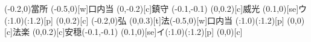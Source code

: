 \documentclass[m_shidai]{subfiles}
\begin{document}
\newline
\karifu(-0.2,0){當所}
{\chikara{\lw}\tsuya{\q}
\aki\qyu\moji(-0.5,0)[w]{口内当}}
\karifu(0,-0.2)[c]{鎮守}
{\qyu\moveTo(-0.1,-0.1)\iro{\c}\sho{}
\iro{\c}\sho\tsuya{\q}}
\karifu(0,0.2)[c]{威光}
  {\tsuya{\q}\ooyu{\q}\kili[e]\moji(0.1,0)[se]{ウ}
   \base(\s:1.0)\modori*(\w:1.2)[p]\orisute
   \iro{\k}\sho\iro[2]{\k}\sho}
\karifu(0,0.2)[c]{\hspace{-0.3zw}}{\chikara{\s}\tsuya{\q}\aki\tsuya{\q}}\newline
\karifu(-0.2,0){弘}{\chikara{\lw}\tsuya{\q}}
\karifu(0,0.3)[t]{法}{\qyu\moji(-0.5,0)[w]{口内当}}
{\tsuya{\q}%
\ooyu{\q}\kili[se]\base(\s:1.0)\modori*(\w:1.2)[p]\orisute\iro{\k}\sho\iro[2]{\k}\sho}%
\karifu(0,0)[c]{法楽}
{\uchitsuke{\q}\tsuya{\q}
\aki\tsuya{\q}}
\newline
{\lwoo\aki{\q}\tsuya{\q}\sho}
\karifu(0,0.2)[c]{安穏}{\qyu\moveTo(-0.1,-0.1)\iro{\c}\sho{}%
\iro{\c}\sho\tsuya{\q}}
{\lwoo\tsu\aki{\q}
\ooyu{\q}\kili[e]\moji(0.1,0)[se]{イ}\base(\s:1.0)\modori*(\w:1.2)[p]\orisute\iro{\k}\sho\iro[2]{\k}\sho}
\karifu(0,0)[c]
{\hspace{-0.2zw}}
{\sho\tsuya{\q}\aki\tsuya{\q}}
\newline
\end{document}
